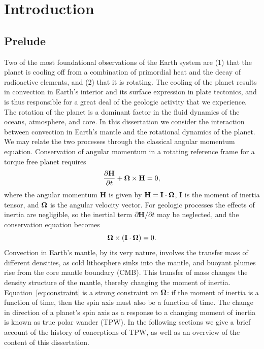 \chapter{Introduction}
\label{chap:intro}

\section{Prelude}

Two of the most foundational observations of the Earth system are 
(1) that the planet is cooling off from a combination of primordial heat and the decay of radioactive elements,
and (2) that it is rotating.
The cooling of the planet results in convection in Earth's interior and its surface expression in plate tectonics,
and is thus responsible for a great deal of the geologic activity that we experience.
The rotation of the planet is a dominant factor in the fluid dynamics of the oceans, atmosphere, and core.
In this dissertation we consider the interaction between convection in Earth's mantle and the rotational dynamics of the planet.
We may relate the two processes through the classical angular momentum equation.
Conservation of angular momentum in a rotating reference frame for a torque free planet requires
\begin{equation}
\frac{\partial \mathbf{H}}{\partial t} + \mitbf{\Omega}\times\mathbf{H} = 0,
\label{eq:conserve_momentum_rotating}
\end{equation}
where the angular momentum $\mathbf{H}$ is given by $\mathbf{H} = \mathbf{I}\cdot\mitbf{\Omega}$,
$\mathbf{I}$ is the moment of inertia tensor, and $\mitbf{\Omega}$ is the angular velocity vector.
For geologic processes the effects of inertia are negligible, so the inertial
term $\partial \mathbf{H} / \partial t$ may be neglected, and the conservation equation becomes 
\begin{equation}
\mitbf{\Omega}\times \left(\mathbf{I} \cdot \mitbf{\Omega}\right)= 0.
\label{eq:constraint}
\end{equation}
Convection in Earth's mantle, by its very nature, involves the transfer mass of different densities,
as cold lithosphere sinks into the mantle, and buoyant plumes rise from the core mantle boundary (CMB).
This transfer of mass changes the density structure of the mantle, thereby changing the moment of inertia.
Equation~\eqref{eq:constraint} is a strong constraint on $\mitbf{\Omega}$: if the moment of inertia
is a function of time, then the spin axis must also be a function of time.
The change in direction of a planet's spin axis as a response to a changing moment of inertia is known as true polar wander (TPW).
In the following sections we give a brief account of the history of conceptions of TPW,
as well as an overview of the content of this dissertation.

